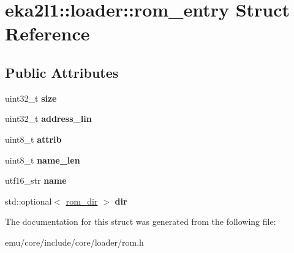 \hypertarget{structeka2l1_1_1loader_1_1rom__entry}{}\section{eka2l1\+:\+:loader\+:\+:rom\+\_\+entry Struct Reference}
\label{structeka2l1_1_1loader_1_1rom__entry}
\subsection*{Public Attributes}
\begin{DoxyCompactItemize}
\item 
\mbox{\label{structeka2l1_1_1loader_1_1rom__entry_abfce4c95abc0fb53456052744a938507}} 
uint32\+\_\+t {\bfseries size}
\item 
\mbox{\label{structeka2l1_1_1loader_1_1rom__entry_ab868cec439bf395908c73a00ede87eab}} 
uint32\+\_\+t {\bfseries address\+\_\+lin}
\item 
\mbox{\label{structeka2l1_1_1loader_1_1rom__entry_ab98ef441157774560221014dbfb0a40c}} 
uint8\+\_\+t {\bfseries attrib}
\item 
\mbox{\label{structeka2l1_1_1loader_1_1rom__entry_a4feee7c08fca6e9b5cbb31f3bbddb088}} 
uint8\+\_\+t {\bfseries name\+\_\+len}
\item 
\mbox{\label{structeka2l1_1_1loader_1_1rom__entry_a1c155846dcc84d42ade415805c11f592}} 
utf16\+\_\+str {\bfseries name}
\item 
\mbox{\label{structeka2l1_1_1loader_1_1rom__entry_ab3db7a915a423a62d3ba81fad5ca5cbb}} 
std\+::optional$<$ \mbox{\hyperlink{structeka2l1_1_1loader_1_1rom__dir}{rom\+\_\+dir}} $>$ {\bfseries dir}
\end{DoxyCompactItemize}


The documentation for this struct was generated from the following file\+:\begin{DoxyCompactItemize}
\item 
emu/core/include/core/loader/rom.\+h\end{DoxyCompactItemize}
